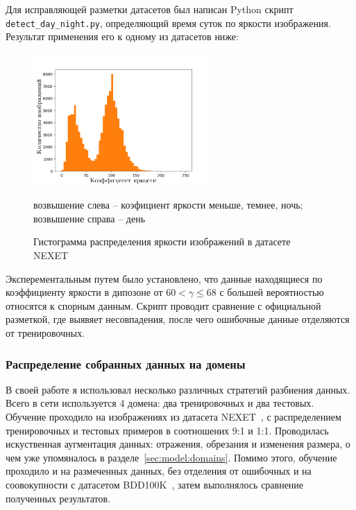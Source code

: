 \documentclass[11pt,a4paper]{extarticle}
\begin{document}
{			\noindent
			Для исправляющей разметки датасетов был написан Python скрипт \texttt{detect\_day\_night.py}, определяющий время суток по яркости изображения.
			Результат применения его к одному из датасетов ниже:
			\begin{figure}[ht]
				\centering
				\includegraphics[width=0.6\textwidth]{img/histogram60}
				\caption{Гистограмма распределения яркости изображений в датасете NEXET}{
					\small{
						возвышение слева -- коэфициент яркости меньше, темнее, ночь;
						возвышение справа -- день
					}
				}
				\label{pic:hist_detect}
			\end{figure}

			\noindent
			Эксперементальным путем было установлено, что данные находящиеся по коэффициенту яркости в дипозоне от \(60 < \gamma \le 68\) с большей вероятностью относятся к спорным данным.
			Скрипт проводит сравнение с официальной разметкой, где выявяет несовпадения, после чего ошибочные данные отделяются от тренировочных.
			
		

		\subsubsection*{Распределение собранных данных на домены}

			В своей работе я использовал несколько различных стратегий разбиения данных.
			Всего в сети используется 4 домена: два тренировочных и два тестовых.
			Обучение проходило на изображениях из датасета NEXET~\cite{data:nexet}, с распределением тренировочных и тестовых примеров в соотношених 9:1 и 1:1.
			Проводилась искуственная аугментация данных: отражения, обрезания и изменения размера, о чем уже упомяналось в разделе~\ref{sec:model:domains}.
			Помимо этого, обучение проходило и на размеченных данных, без отделения от ошибочных и на соовокупности с датасетом BDD100K~\cite{data:bdd100k}, затем выполнялось сравнение полученных результатов.
			
}
\end{document}
